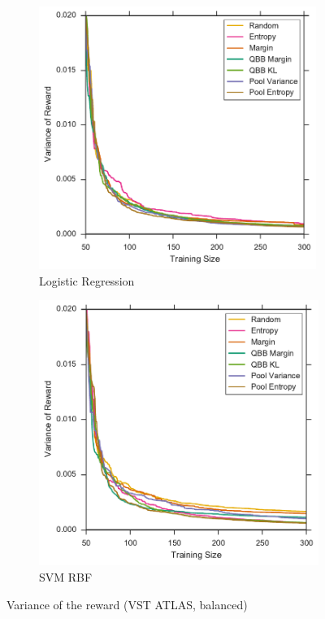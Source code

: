 \begin{figure}[p]
	\centering
	\begin{subfigure}{.5\textwidth}
		\centering
		\includegraphics[width=0.99\textwidth]{figures/5_thompson/vstatlas_bl_sigmas}
		\caption{Logistic Regression}
		\label{fig:vstatlas_bl_sigmas}
	\end{subfigure}%
	\begin{subfigure}{.5\textwidth}
		\centering
		\includegraphics[width=0.99\linewidth]{figures/5_thompson/vstatlas_br_sigmas}
		\caption{SVM RBF}
		\label{fig:vstatlas_br_sigmas}
	\end{subfigure}
	\caption[Variance of the reward (VST ATLAS, balanced)]{
		Variance of the reward (VST ATLAS, balanced)}
	\label{fig:vstatlas_b_sigmas}
\end{figure}

